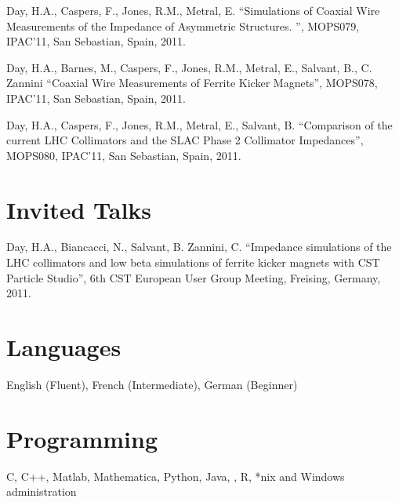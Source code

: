 \documentclass[margin,line]{resume}
\begin{document}
\begin{resume}
\vspace{-2mm}

	Day, H.A., Caspers, F., Jones, R.M., Metral, E.
    ``Simulations of Coaxial Wire Measurements of the Impedance of Asymmetric Structures. '',
    MOPS079, IPAC'11, San Sebastian, Spain, 2011.

\vspace{-2mm}

	Day, H.A., Barnes, M., Caspers, F., Jones, R.M., Metral, E., Salvant, B., C. Zannini
    ``Coaxial Wire Measurements of Ferrite Kicker Magnets'',
    MOPS078, IPAC'11, San Sebastian, Spain, 2011.

\vspace{-2mm}

	Day, H.A., Caspers, F., Jones, R.M., Metral, E., Salvant, B.
    ``Comparison of the current LHC Collimators and the SLAC Phase 2 Collimator Impedances'',
    MOPS080, IPAC'11, San Sebastian, Spain, 2011.

    \section{\mysidestyle Invited Talks}

	Day, H.A., Biancacci, N., Salvant, B. Zannini, C.
    ``Impedance simulations of the LHC collimators and low beta simulations of ferrite kicker magnets with CST Particle Studio'',
    6th CST European User Group Meeting, Freising, Germany, 2011.


    \section{\mysidestyle Languages} 

   English (Fluent), French (Intermediate), German (Beginner)


    \section{\mysidestyle Programming} 

    C, C++, Matlab, Mathematica, Python, Java, \LaTeXe, R, *nix and Windows administration




\end{resume}
\end{document}
